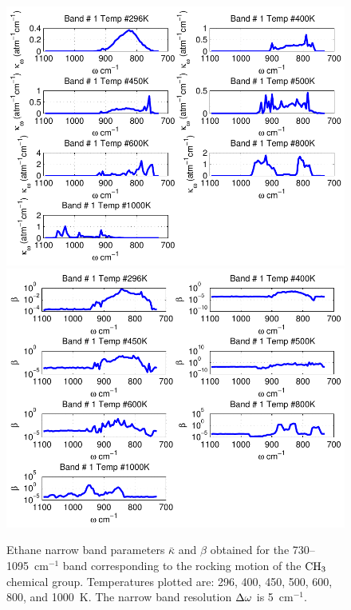 \begin{figure}[p]
\begin{center}
\includegraphics[width=5.0in]{Figures/Ethane_Kappa_Band1_MALKMUS.pdf}
\includegraphics[width=5.0in]{Figures/Ethane_Beta_Band1_MALKMUS.pdf}
\end{center}
\caption{Ethane narrow band parameters $\bar{\kappa}$ and $\beta$ obtained for the 730--1095~cm$^{-1}$ band corresponding to the rocking motion of the $\rm CH_3$ chemical group. Temperatures plotted are: 296, 400, 450, 500, 600, 800, and 1000~K. The narrow band resolution $\Delta \omega$ is 5~cm$^{-1}$.\label{fig:ethane_kappa_beta1}}
\end{figure}

